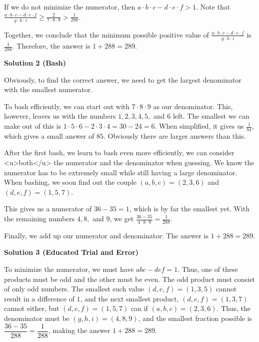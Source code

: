 \begin{enumerate}
 If we do not minimize the numerator, then $a \cdot b \cdot c - d \cdot e \cdot f > 1.$ Note that $\frac{a \cdot b \cdot c - d \cdot e \cdot f}{g \cdot h \cdot i} \geq \frac{2}{7\cdot8\cdot9} > \frac{1}{288}.$

 Together, we conclude that the minimum possible positive value of $\frac{a \cdot b \cdot c - d \cdot e \cdot f}{g \cdot h \cdot i}$ is $\frac{1}{288}.$ Therefore, the answer is $1+288=\boxed{289}.$




\textbf{Solution 2 (Bash)}

Obviously, to find the correct answer, we need to get the largest denominator with the smallest numerator. 

 To bash efficiently, we can start out with $7\cdot8\cdot9$ as our denominator. This, however, leaves us with the numbers $1, 2, 3, 4, 5,$ and $6$ left. The smallest we can make out of this is $1\cdot5\cdot6 - 2\cdot3\cdot4 = 30 - 24 = 6$. When simplified, it gives us $\frac{1}{84}$, which gives a small answer of $85$. Obviously there are larger answers than this.

 After the first bash, we learn to bash even more efficiently, we can consider <u>both</u> the numerator and the denominator when guessing. We know the numerator has to be extremely small while still having a large denominator. When bashing, we soon find out the couple $(a,b,c)=(2,3,6)$ and $(d,e,f)=(1,5,7)$.

 This gives us a numerator of $36-35=1$, which is by far the smallest yet. With the remaining numbers $4, 8,$ and $9$, we get $\frac{36-35}{4\cdot8\cdot9}=\frac{1}{288}$.

 Finally, we add up our numerator and denominator: The answer is $1+288=\boxed{289}$.

 



\textbf{Solution 3 (Educated Trial and Error)}

To minimize the numerator, we must have $abc - def = 1$. Thus, one of these products must be odd and the other must be even. The odd product must consist of only odd numbers. The smallest such value $(d, e, f) = (1, 3, 5)$ cannot result in a difference of $1$, and the next smallest product, $(d, e, f) = (1, 3, 7)$ cannot either, but $(d, e, f) = (1, 5, 7)$ can if $(a, b, c) = (2, 3, 6)$. Thus, the denominator must be $(g, h, i) = (4, 8, 9)$, and the smallest fraction possible is $\dfrac{36 - 35}{288} = \dfrac{1}{288}$, making the answer $1 + 288 = \boxed{289}$.


\end{enumerate}
